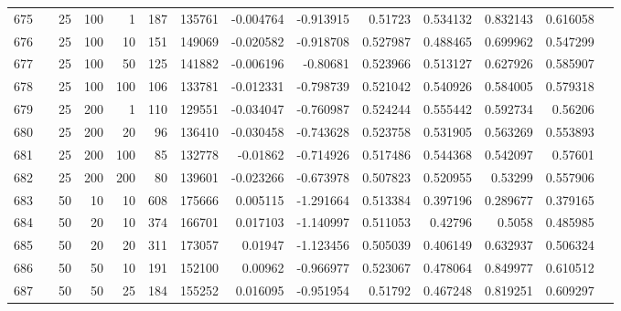 \begin{longtable}{llrrrrrrrrrrrr}
		675 & &           25 &               100 &            1 &         187 &     135761 & -0.004764 & -0.913915 &   0.51723 &    0.534132 &       0.832143 &  0.616058 \\
		676 & &           25 &               100 &           10 &         151 &     149069 & -0.020582 & -0.918708 &  0.527987 &    0.488465 &       0.699962 &  0.547299 \\
		677 & &           25 &               100 &           50 &         125 &     141882 & -0.006196 &  -0.80681 &  0.523966 &    0.513127 &       0.627926 &  0.585907 \\
		678 & &           25 &               100 &          100 &         106 &     133781 & -0.012331 & -0.798739 &  0.521042 &    0.540926 &       0.584005 &  0.579318 \\
		679 & &           25 &               200 &            1 &         110 &     129551 & -0.034047 & -0.760987 &  0.524244 &    0.555442 &       0.592734 &   0.56206 \\
		680 & &           25 &               200 &           20 &          96 &     136410 & -0.030458 & -0.743628 &  0.523758 &    0.531905 &       0.563269 &  0.553893 \\
		681 & &           25 &               200 &          100 &          85 &     132778 &  -0.01862 & -0.714926 &  0.517486 &    0.544368 &       0.542097 &   0.57601 \\
		682 & &           25 &               200 &          200 &          80 &     139601 & -0.023266 & -0.673978 &  0.507823 &    0.520955 &        0.53299 &  0.557906 \\
		683 & &           50 &                10 &           10 &         608 &     175666 &  0.005115 & -1.291664 &  0.513384 &    0.397196 &       0.289677 &  0.379165 \\
		684 & &           50 &                20 &           10 &         374 &     166701 &  0.017103 & -1.140997 &  0.511053 &     0.42796 &         0.5058 &  0.485985 \\
		685 & &           50 &                20 &           20 &         311 &     173057 &   0.01947 & -1.123456 &  0.505039 &    0.406149 &       0.632937 &  0.506324 \\
		686 & &           50 &                50 &           10 &         191 &     152100 &   0.00962 & -0.966977 &  0.523067 &    0.478064 &       0.849977 &  0.610512 \\
		687 & \multirow[b]{10}{*}{\rotatebox[origin=l]{90}{use-mean}} &           50 &                50 &           25 &         184 &     155252 &  0.016095 & -0.951954 &   0.51792 &    0.467248 &       0.819251 &  0.609297 \\

\end{longtable}
